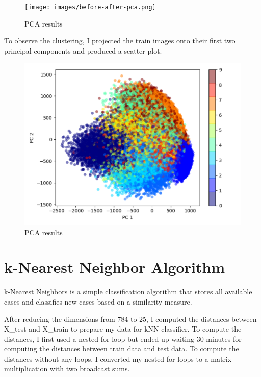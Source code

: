 \begin{figure}[H] \centering
    \texttt{[image: images/before-after-pca.png]}
    \caption*{PCA results} \setlength{\belowcaptionskip}{-40pt}
    \setlength{\abovecaptionskip}{-40pt}
\end{figure}

To observe the clustering, I projected the train images onto their first two
principal components and produced a scatter plot. 

\begin{figure}[H]
    \centering
    \includegraphics[width=\textwidth]{images/pca.png}
    \caption*{PCA results}
    \setlength{\belowcaptionskip}{-40pt}
    \setlength{\abovecaptionskip}{-40pt}
\end{figure}


\section*{k-Nearest Neighbor Algorithm}

k-Nearest Neighbors is a simple classification algorithm that stores all
available cases and classifies new cases based on a similarity measure.

After reducing the dimensions from 784 to 25, I computed the distances between
X\_test and X\_train to prepare my data for kNN classifier. To compute the
distances, I first used a nested for loop but ended up waiting 30 minutes for
computing the distances between train data and test data. To compute the
distances without any loops, I converted my nested for loops to a matrix
multiplication with two broadcast sums.

